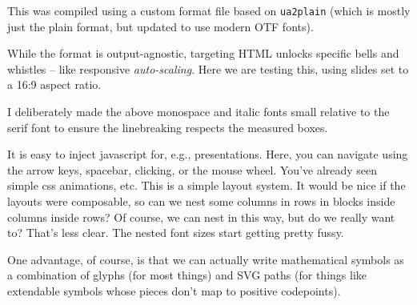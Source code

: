     \beginrow
        \begincol
            \beginblock
                \vskip 20pt 
                {\bodyfonti This was compiled using a custom format file based on {\tt ua2plain} (which is mostly just the plain format, but updated to use modern OTF fonts).}
            \endblock
            \pause
            \beginblock
                \vskip 20pt
                {\bodyfonti
                While the format is output-agnostic, targeting HTML unlocks specific bells and whistles -- like responsive {\it auto-scaling}.
                Here we are testing this, using slides set to a 16:9 aspect ratio.
                
                \vskip 20pt
                I deliberately made the above monospace and italic fonts small relative to the serif font to ensure the linebreaking respects the measured boxes.
                }
            \endblock
        \endcol
        
        \pause
        \begincol
            \beginblock
                \vskip 15pt
                {\bodyfonti
                It is {\bodyitalici easy} to inject javascript for, e.g., presentations. 
                Here, you can navigate using the arrow keys, spacebar, clicking, or 
                the mouse wheel. You've already seen simple css animations, etc.
                }
            \endblock
            \pause
            \beginblock
                \vskip 20pt
                \beginrow
                    \begincol
                    This is a simple layout system.  It would be nice if the layouts were composable, so can we nest some columns in rows in blocks inside columns inside rows?
                    \endcol
                    \pause
                    \begincol
                    Of course, we can nest in this way, but do we really want to?
                    That's less clear. The nested font sizes start getting pretty fussy.
                    \endcol
                \endrow
            \endblock
            
        \endcol
    \endrow
\endslide



    One advantage, of course, is that we can actually write mathematical symbols as a combination of glyphs (for most things) and SVG paths (for things like extendable symbols whose pieces don't map to positive codepoints).

